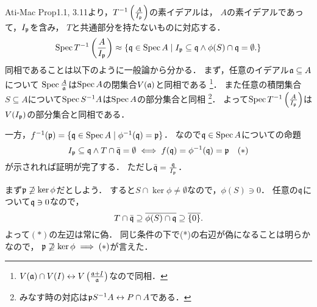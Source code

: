 \documentclass[a4paper]{jsarticle}
\begin{document}
    Ati-Mac Prop1.1, 3.11より，$T^{-1}\left( \frac{A}{I_{\mathfrak{p}}} \right)$の素イデアルは，
    $A$の素イデアルであって，$I_{\mathfrak{p}}$を含み，
    $T$と共通部分を持たないものに対応する．
    \[
        \operatorname{Spec} T^{-1}\left( \frac{A}{I_{\mathfrak{p}}} \right)
        \approx
        \{\mathfrak{q} \in \operatorname{Spec} A \mid I_{\mathfrak{p}} \subseteq \mathfrak{q} \land \phi(S) \cap \mathfrak{q}=\emptyset. \}
    \]
    同相であることは以下のように一般論から分かる．
    まず，任意のイデアル$\mathfrak{a} \subseteq A$について
    $\operatorname{Spec} \frac{A}{\mathfrak{a}}$は$\operatorname{Spec} A$の閉集合$V(\mathfrak{a})$と同相である
    \footnote{$V(\mathfrak{a}) \cap V(I) \leftrightarrow V \left( \frac{\mathfrak{a}+I}{\mathfrak{a}} \right)$なので同相．}．
    また任意の積閉集合$S \subseteq A$について$\operatorname{Spec} S^{-1}A$は$\operatorname{Spec} A$の部分集合と同相
    \footnote{みなす時の対応は$\mathfrak{p}S^{-1}A \leftrightarrow P \cap A$である．}．
    よって$\operatorname{Spec} T^{-1}\left( \frac{A}{I_{\mathfrak{p}}} \right)$は
    $V(I_{\mathfrak{p}})$の部分集合と同相である．

    一方，$f^{-1}(\mathfrak{p})=\{ \mathfrak{q} \in \operatorname{Spec} A \mid \phi^{-1}(\mathfrak{q})=\mathfrak{p} \}$．
    なので$\mathfrak{q} \in \operatorname{Spec} A$についての命題
    \[
        I_{\mathfrak{p}} \subseteq \mathfrak{q} \land T \cap \bar{\mathfrak{q}}=\emptyset
        \iff
        f(\mathfrak{q})=\phi^{-1}(\mathfrak{q})=\mathfrak{p}
        ~~~(*)
    \]
    が示されれば証明が完了する．
    ただし$\bar{\mathfrak{q}}=\frac{\mathfrak{q}}{I_{\mathfrak{p}}}$．

    まず$\mathfrak{p} \not \supseteq \ker \phi$だとしよう．
    すると$S \cap \ker \phi \neq \emptyset$なので，$\phi(S) \ni 0$．
    任意の$\mathfrak{q}$について$\mathfrak{q} \ni 0$なので，
    \[ T \cap \bar{\mathfrak{q}} \supseteq \overline{\phi(S) \cap \mathfrak{q}} \supseteq \overline{\{0\}}. \]
    よって$(*)$の左辺は常に偽．
    同じ条件の下で(*)の右辺が偽になることは明らかなので，
    $\mathfrak{p} \not \supseteq \ker \phi \implies (*)$が言えた．
\end{document}
